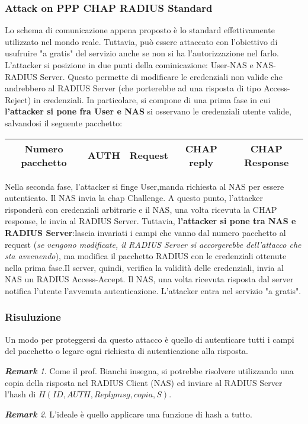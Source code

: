 \documentclass{article}
\theoremstyle{remark}
\newtheorem*{remark}{\textbf{Remark}}
\begin{document}
\subsubsection{Attack on PPP CHAP RADIUS Standard}
Lo schema di comunicazione appena proposto è lo standard effettivamente utilizzato nel mondo reale. Tuttavia, può essere attaccato con l'obiettivo di usufruire "a gratis" del servizio anche se non si ha l'autorizzazione nel farlo.\newline
L'attacker si posizione in due punti della cominicazione: User-NAS e NAS-RADIUS Server. Questo permette di modificare le credenziali non valide che andrebbero al RADIUS Server (che porterebbe ad una risposta di tipo Access-Reject) in credenziali.\newline
In particolare, si compone di una prima fase in cui \textbf{l'attacker si pone fra User e NAS} si osservano le credenziali utente valide, salvandosi il seguente pacchetto:
\begin{center}
	\begin{tabular}{ |c|c|c|c|c| }
		\hline
		Numero pacchetto & AUTH & Request & CHAP reply & CHAP Response \\
		\hline
	\end{tabular}
\end{center}
Nella seconda fase, l'attacker si finge User,manda richiesta al NAS per essere autenticato. Il NAS invia la chap Challenge. A questo punto, l'attacker risponderà con credenziali arbitrarie e il NAS, una volta ricevuta la CHAP response, le invia al RADIUS Server. Tuttavia, \textbf{l'attacker si pone tra NAS e RADIUS Server}:lascia invariati i campi che vanno dal numero pacchetto al request (\emph{se vengono modificate, il RADIUS Server si accorgerebbe dell'attacco che sta avvenendo}), ma modifica il pacchetto RADIUS con le credenziali ottenute nella prima fase.Il server, quindi, verifica la validità delle credenziali, invia al NAS un RADIUS Access-Accept. Il NAS, una volta ricevuta risposta dal server notifica l'utente l'avvenuta autenticazione.\newline
L'attacker entra nel servizio "a gratis".
\subsubsection{Risuluzione}
Un modo per proteggersi da questo attacco è quello di autenticare tutti i campi del pacchetto o legare ogni richiesta di autenticazione alla risposta.
\begin{remark}
	Come il prof. Bianchi insegna, si potrebbe risolvere utilizzando una copia della risposta nel RADIUS Client (NAS) ed inviare al RADIUS Server l'hash di $H(ID,AUTH,Replymsg,copia,S)$.
\end{remark}
\begin{remark}
	L'ideale è quello applicare una funzione di hash a tutto.
\end{remark}
\end{document}

